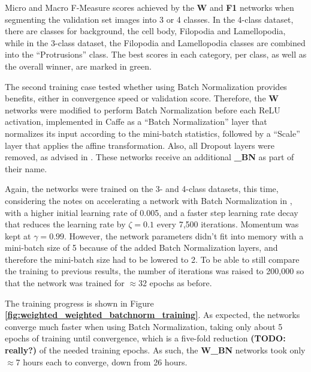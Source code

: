 \begin {table}
\caption[Micro and Macro F-Measure scores for networks with weighted Cross-Entropy and F-Measure loss functions.]{Micro and Macro F-Measure scores achieved by the \textbf{W} and \textbf{F1} networks when segmenting the validation set images into 3 or 4 classes. In the 4-class dataset, there are classes for background, the cell body, Filopodia and Lamellopodia, while in the 3-class dataset, the Filopodia and Lamellopodia classes are combined into the ``Protrusions'' class. The best scores in each category, per class, as well as the overall winner, are marked in green.}
\label{tab:results1}
\end {table}

\noindent The second training case tested whether using Batch Normalization provides benefits, either in convergence speed or validation score. Therefore, the \textbf{W} networks were modified to perform Batch Normalization before each ReLU activation, implemented in Caffe as a ``Batch Normalization'' layer that normalizes its input according to the mini-batch statistics, followed by a ``Scale'' layer that applies the affine transformation. Also, all Dropout layers were removed, as advised in \cite{batchnorm}. These networks receive an additional \textbf{\_BN} as part of their name.

Again, the networks were trained on the 3- and 4-class datasets, this time, considering the notes on accelerating a network with Batch Normalization in \cite{batchnorm}, with a higher initial learning rate of 0.005, and a faster step learning rate decay that reduces the learning rate by $\zeta = 0.1$ every 7,500 iterations. Momentum was kept at $\gamma = 0.99$. However, the network parameters didn't fit into memory with a mini-batch size of 5 because of the added Batch Normalization layers, and therefore the mini-batch size had to be lowered to 2. To be able to still compare the training to previous results, the number of iterations was raised to 200,000 so that the network was trained for $\approx$32 epochs as before.

The training progress is shown in Figure \textbf{\ref{fig:weighted_weighted_batchnorm_training}}. As expected, the networks converge much faster when using Batch Normalization, taking only about 5 epochs of training until convergence, which is a five-fold reduction \textbf{(TODO: really?)} of the needed training epochs. As such, the \textbf{W\_BN} networks took only $\approx$7 hours each to converge, down from 26 hours.\\


